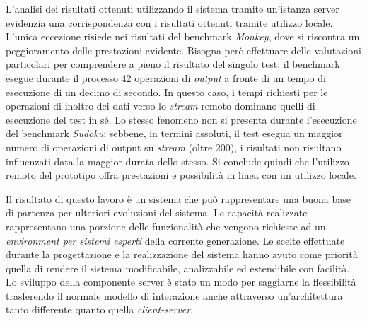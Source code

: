 L'analisi dei risultati ottenuti utilizzando il sistema tramite un'istanza server evidenzia una corrispondenza con i risultati ottenuti tramite utilizzo locale. L'unica eccezione risiede nei risultati del benchmark \emph{Monkey}, dove si riscontra un peggioramento delle prestazioni evidente. Bisogna però effettuare delle valutazioni particolari per comprendere a pieno il risultato del singolo test: il benchmark esegue durante il processo 42 operazioni di \emph{output} a fronte di un tempo di esecuzione di un decimo di secondo. In questo caso, i tempi richiesti per le operazioni di inoltro dei dati verso lo \emph{stream} remoto dominano quelli di esecuzione del test in sé. Lo stesso fenomeno non si presenta durante l'esecuzione del benchmark \emph{Sudoku}: sebbene, in termini assoluti, il test esegua un maggior numero di operazioni di output su \emph{stream} (oltre 200), i risultati non risultano influenzati data la maggior durata dello stesso. Si conclude quindi che l'utilizzo remoto del prototipo offra prestazioni e possibilità in linea con un utilizzo locale.

Il risultato di questo lavoro è un sistema che può rappresentare una buona base di partenza per ulteriori evoluzioni del sistema. 
Le capacità realizzate rappresentano una porzione delle funzionalità che vengono richieste ad un \emph{environment per sistemi esperti} della corrente generazione. Le scelte effettuate durante la progettazione e la realizzazione del sistema hanno avuto come priorità quella di rendere il sistema modificabile, analizzabile ed estendibile con facilità. Lo sviluppo della componente server è stato un modo per saggiarne la flessibilità trasferendo il normale modello di interazione anche attraverso un'architettura tanto differente quanto quella \emph{client-server}.

